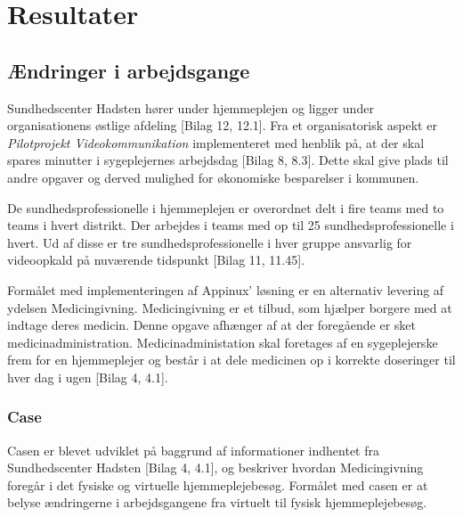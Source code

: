 \section{Resultater}


\subsection{Ændringer i arbejdsgange}\label{sec:arbejdsgange}
Sundhedscenter Hadsten hører under hjemmeplejen og ligger under organisationens østlige afdeling [Bilag 12, 12.1]. Fra et organisatorisk aspekt er \textit{Pilotprojekt Videokommunikation} implementeret med henblik på, at der skal spares minutter i sygeplejernes arbejdsdag [Bilag 8, 8.3]. Dette skal give plads til andre opgaver og derved mulighed for økonomiske besparelser i kommunen. 

De sundhedsprofessionelle i hjemmeplejen er overordnet delt i fire teams med to teams i hvert distrikt. Der arbejdes i teams med op til 25 sundhedsprofessionelle i hvert. Ud af disse er tre sundhedsprofessionelle i hver gruppe ansvarlig for videoopkald på nuværende tidspunkt [Bilag 11, 11.45].

Formålet med implementeringen af Appinux’ løsning er en alternativ levering af ydelsen Medicingivning.  Medicingivning er et tilbud, som hjælper borgere med at indtage deres medicin. Denne opgave afhænger af at der foregående er sket medicinadministration. Medicinadministation skal foretages af en sygeplejerske frem for en hjemmeplejer og består i at dele medicinen op i korrekte doseringer til hver dag i ugen [Bilag 4, 4.1].


\subsubsection{Case}
Casen er blevet udviklet på baggrund af informationer indhentet fra Sundhedscenter Hadsten [Bilag 4, 4.1], og beskriver hvordan Medicingivning foregår i det fysiske og virtuelle hjemmeplejebesøg.
Formålet med casen er at belyse ændringerne i arbejdsgangene fra virtuelt til fysisk hjemmeplejebesøg.

